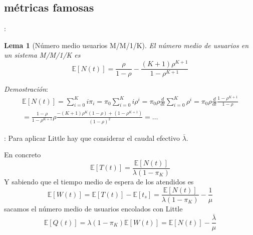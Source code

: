 \documentclass[xcolor={x11names}]{beamer}
\newtheorem{lema}{Lema}[section]
\begin{document}
\subsection{métricas famosas}
\begin{frame}{\secname: \subsecname}
    \begin{lema}[Número medio usuarios M/M/1/K]
        El número medio de usuarios en un
        sistema M/M/1/K es
        \begin{equation}
            \mathbb{E}[N(t)]=
            \frac{\rho}{1-\rho}-
            \frac{(K+1)\rho^{K+1}}{1-\rho^{K+1}}
        \end{equation}
    \end{lema}

    \vfill

    \textit{Demostración}:
    \begin{multline*}
        \mathbb{E}[N(t)]=
        \sum_{i=0}^{K}i \pi_i
        =\pi_0\sum_{i=0}^K i\rho^i
        =\pi_0\rho\frac{d}{dt}
        \sum_{i=0}^K\rho^i
        = \pi_0\rho \frac{d}{dt}
        \frac{1-\rho^{K+1}}{1-\rho}\\
        =\frac{1-\rho}{1-\rho^{K+1}}\rho
        \frac{-(K+1)\rho^K(1-\rho)+(1-\rho^{K+1})}{(1-\rho)^2}=\ldots
    \end{multline*}
\end{frame}



\begin{frame}{\secname: \subsecname}
    Para aplicar Little hay que considerar
    el caudal efectivo $\overline{\lambda}$.
    \begin{figure}
        \resizebox{!}{.15\textwidth}{%
            
        }
    \end{figure}
    En concreto
    \begin{equation*}
        \mathbb{E}[T(t)]=
        \frac{\mathbb{E}[N(t)]}{\lambda(1-\pi_K)}
    \end{equation*}
    Y sabiendo que el tiempo medio de
    espera de los atendidos es
    \begin{equation*}
        \mathbb{E}[W(t)]=
        \mathbb{E}[T(t)]-\mathbb{E}[t_s]
        =\frac{\mathbb{E}[N(t)]}{\lambda(1-\pi_K)}
        - \frac{1}{\mu}
    \end{equation*}
    sacamos el número medio de usuarios
    encolados con Little
    \begin{equation*}
        \mathbb{E}[Q(t)]=
        \lambda(1-\pi_K)
        \mathbb{E}[W(t)]=
        \mathbb{E}[N(t)]-
        \frac{\overline{\lambda}}{\mu}
    \end{equation*}
\end{frame}
\end{document}

